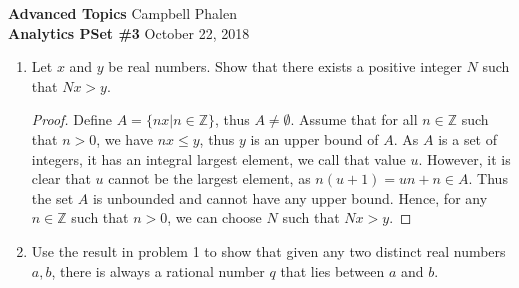 \documentclass[11pt, leqno]{article}
\begin{document}
{\bfseries Advanced Topics} \hspace*{\fill} Campbell Phalen \\
{\bfseries Analytics PSet \#3} \hspace*{\fill}October 22, 2018
\vspace{1pc}

\hrulefill
\vspace{1pc}
	


\begin{enumerate}

	\item
	Let $x$ and $y$ be real numbers. Show that there exists a positive integer $N$ such that $Nx > y$.
	
	\begin{proof}
	Define $A = \{nx | n \in \mathbb{Z}\}$, thus $A \neq \emptyset$. Assume that for all $n \in \mathbb{Z}$ such that  $n > 0$, we have $nx \leq y$, thus $y$ is an upper bound of $A$. As $A$ is a set of integers, it has an integral largest element, we call that value $u$. However, it is clear that $u$ cannot be the largest element, as $n(u + 1) = un + n \in A$.  Thus the set $A$ is unbounded and cannot have any upper bound. Hence, for any $n \in \mathbb{Z}$ such that $n > 0$, we can choose $N$ such that $Nx > y$.
 	\end{proof}
	
	\item
	Use the result in problem 1 to show that given any two distinct real numbers $a,b$, there is always a rational number $q$ that lies between $a$ and $b$.
	

\end{enumerate}
\end{document}
